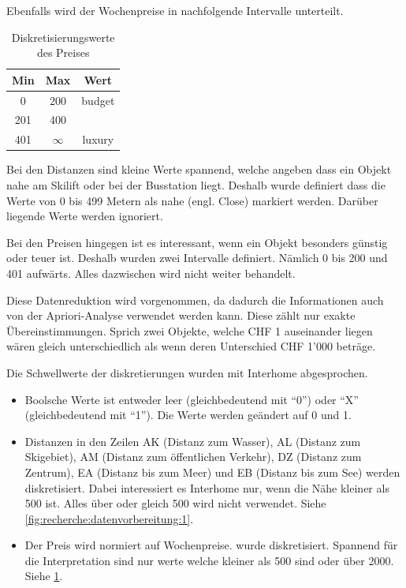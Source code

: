 Ebenfalls wird der Wochenpreise in nachfolgende Intervalle unterteilt.
\begin{table}[h] 
	\caption{Diskretisierungswerte des Preises}
	\centering
	\label{fig:recherche:datenvorbereitung:2}
	\begin{tabular}{ | c | c | c | } 
		\hline 
		\rowcolor{tableheadcolor}
		\bfseries Min & \bfseries Max & \bfseries Wert \\ \hline 
		0 & 200 & budget \\ \hline 
		201 & 400 &  \\ \hline 
		401 & $\infty$ & luxury \\ \hline 
	\end{tabular}
\end{table}

Bei den Distanzen sind kleine Werte spannend, welche angeben dass ein Objekt nahe am Skilift oder bei der Busstation liegt. Deshalb wurde definiert dass die Werte von 0 bis 499 Metern als nahe (engl. Close) markiert werden. Darüber liegende Werte werden ignoriert.

Bei den Preisen hingegen ist es interessant, wenn ein Objekt besonders günstig oder teuer ist. Deshalb wurden zwei Intervalle definiert. Nämlich 0 bis 200 und 401 aufwärts. Alles dazwischen wird nicht weiter behandelt.

Diese Datenreduktion wird vorgenommen, da dadurch die Informationen auch von der Apriori-Analyse verwendet werden kann. Diese zählt nur exakte Übereinstimmungen. Sprich zwei Objekte, welche CHF 1 auseinander liegen wären gleich unterschiedlich als wenn deren Unterschied CHF 1'000 beträge.

Die Schwellwerte der diskretierungen wurden mit Interhome abgesprochen.

\begin{itemize}
\item Boolsche Werte ist entweder leer (gleichbedeutend mit "`0"') oder "`X"' (gleichbedeutend mit "`1"'). Die Werte werden geändert auf 0 und 1.
\item Distanzen in den Zeilen AK (Distanz zum Wasser), AL (Distanz zum Skigebiet), AM (Distanz zum öffentlichen Verkehr), DZ (Distanz zum Zentrum), EA (Distanz bis zum Meer) und EB (Distanz bis zum See) werden diskretisiert. Dabei interessiert es Interhome nur, wenn die Nähe kleiner als 500 ist. Alles über oder gleich 500 wird nicht verwendet. Siehe \cref{fig:recherche:datenvorbereitung:1}.
\item Der Preis wird normiert auf Wochenpreise. wurde diskretisiert. Spannend für die Interpretation sind nur werte welche kleiner als 500 sind oder über 2000. Siehe \cref{fig:recherche:datenvorbereitung:2}.
\end{itemize}

